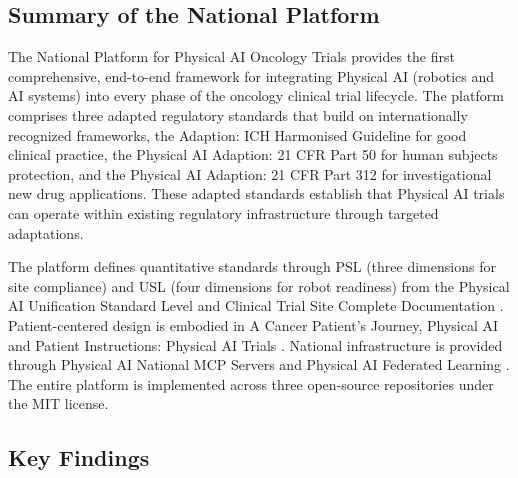 
\subsection{Summary of the National Platform}
\label{subsec:conclusion-summary}

The National Platform for Physical AI Oncology Trials provides the first
comprehensive, end-to-end framework for integrating Physical AI (robotics and
AI systems) into every phase of the oncology clinical trial lifecycle. The
platform comprises three adapted regulatory standards that build on
internationally recognized frameworks, the Adaption: ICH Harmonised Guideline
\cite{ich-adapt} for good clinical practice, the Physical AI Adaption: 21 CFR
Part 50 \cite{cfr50-adapt} for human subjects protection, and the Physical AI
Adaption: 21 CFR Part 312 \cite{cfr312-adapt} for investigational new drug
applications. These adapted standards establish that Physical AI trials can
operate within existing regulatory infrastructure through targeted adaptations.

The platform defines quantitative standards through PSL (three dimensions for
site compliance) and USL (four dimensions for robot readiness) from the Physical
AI Unification Standard Level \cite{usl-standard} and Clinical Trial Site
Complete Documentation \cite{site-docs}. Patient-centered design is embodied in
A Cancer Patient's Journey, Physical AI \cite{patient-journey-paper} and
Patient Instructions: Physical AI Trials \cite{patient-instructions-paper}.
National infrastructure is provided through Physical AI National MCP Servers
\cite{national-mcp-paper} and Physical AI Federated Learning \cite{fl-paper}.
The entire platform is implemented across three open-source repositories
\cite{main-repo, mcp-repo, fl-repo} under the MIT license.

\subsection{Key Findings}
\label{subsec:conclusion-findings}

